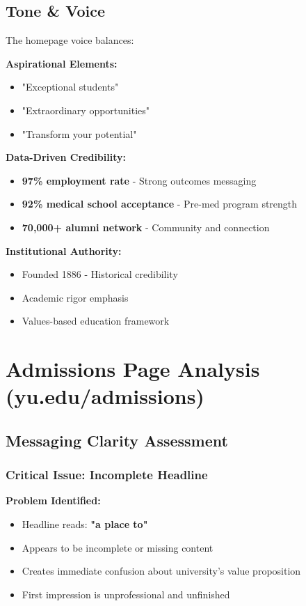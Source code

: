 \documentclass[12pt,letterpaper]{article}
\begin{document}
\subsection{Tone \& Voice}

The homepage voice balances:

\textbf{Aspirational Elements:}
\begin{itemize}[leftmargin=*]
    \item "Exceptional students"
    \item "Extraordinary opportunities"
    \item "Transform your potential"
\end{itemize}

\textbf{Data-Driven Credibility:}
\begin{itemize}[leftmargin=*]
    \item \textbf{97\% employment rate} - Strong outcomes messaging
    \item \textbf{92\% medical school acceptance} - Pre-med program strength
    \item \textbf{70,000+ alumni network} - Community and connection
\end{itemize}

\textbf{Institutional Authority:}
\begin{itemize}[leftmargin=*]
    \item Founded 1886 - Historical credibility
    \item Academic rigor emphasis
    \item Values-based education framework
\end{itemize}

\section{Admissions Page Analysis (yu.edu/admissions)}

\subsection{Messaging Clarity Assessment}

\subsubsection{Critical Issue: Incomplete Headline}

\textbf{Problem Identified:}
\begin{itemize}[leftmargin=*]
    \item Headline reads: \textbf{"a place to"}
    \item Appears to be incomplete or missing content
    \item Creates immediate confusion about university's value proposition
    \item First impression is unprofessional and unfinished
\end{itemize}
\end{document}
